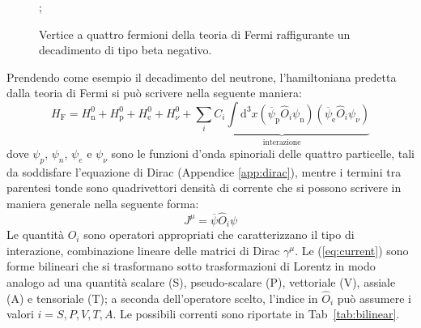 \documentclass{subnucbo}
\begin{document}
\begin{figure}[!h]
        \centering
        ;
        \caption{Vertice a quattro fermioni della teoria di Fermi raffigurante un decadimento di tipo beta negativo.}
        \label{fig:fermi_decay}
\end{figure}
Prendendo come esempio il decadimento del neutrone, l'hamiltoniana predetta dalla teoria di Fermi si può scrivere nella seguente maniera:
\begin{equation}
        H _ { \mathrm { F } } = H _ { \mathrm { n } } ^ { 0 } + H _ { \mathrm { p } } ^ { 0 } + H _ { \mathrm { e } } ^ { 0 } + H _ { \nu } ^ { 0 } + \underbrace { \sum _ { i } C _ { i } \int \mathrm { d } ^ { 3 } x \left( \overline { \psi } _ { \mathrm { p } } \hat { O } _ { i } \psi _ { \mathrm { n } } \right) \left( \overline { \psi } _ { \mathrm { e } } \hat { O } _ { i } \psi _ { \nu } \right) } _ { \text { interazione } }
        \label{eq:fermi_hamiltonian}
\end{equation}
dove $\psi_{p}$, $\psi_{n}$, $\psi_{e}$ e $\psi_{\nu}$ sono le funzioni d'onda spinoriali delle quattro particelle, tali da soddisfare l'equazione di Dirac (Appendice \ref{app:dirac}), mentre i termini tra parentesi tonde sono quadrivettori densità di corrente che si possono scrivere in maniera generale nella seguente forma:
\begin{equation}
        J ^ { \mu } = \overline { \psi } \hat{O} _ { i } \psi
        \label{eq:current}
\end{equation}
Le quantità $\hat{O}_{i}$ sono operatori appropriati che caratterizzano il tipo di interazione, combinazione lineare delle matrici di Dirac $\gamma^{\mu}$.
Le (\ref{eq:current}) sono forme bilineari che si trasformano sotto trasformazioni di Lorentz in modo analogo ad una quantità scalare (S), pseudo-scalare (P), vettoriale (V), assiale (A) e tensoriale (T); a seconda dell'operatore scelto, l'indice in $\hat{O}_{i}$ può assumere i valori $i = S, P, V, T, A$. Le possibili correnti sono riportate in Tab~\ref{tab:bilinear}.
\end{document}
